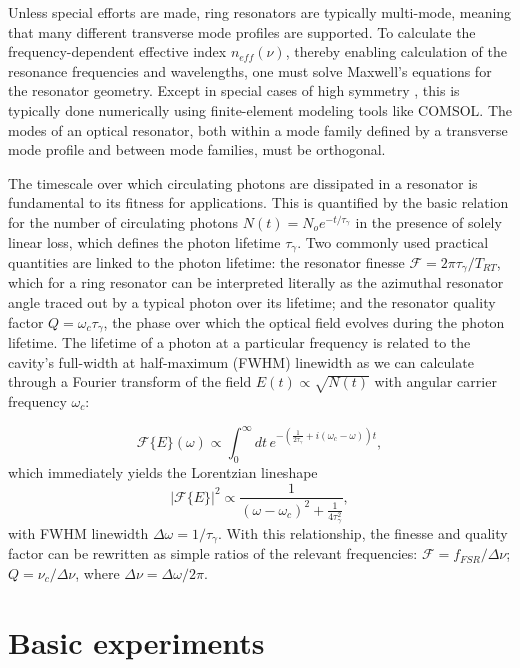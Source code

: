 	 Unless special efforts are made, ring resonators are typically multi-mode, meaning that many different transverse mode profiles are supported. To calculate the frequency-dependent effective index $n_{eff}(\nu)$, thereby enabling calculation of the resonance frequencies and wavelengths, one must solve Maxwell's equations for the resonator geometry. Except in special cases of high symmetry \cite{microsphereresonators}, this is typically done numerically using finite-element modeling tools like COMSOL. The modes of an optical resonator, both within a mode family defined by a transverse mode profile and between mode families, must be orthogonal. 

 The timescale over which circulating photons are dissipated in a resonator is fundamental to its fitness for applications. This is quantified by the basic relation for the number of circulating photons $N(t)=N_oe^{-t/\tau_\gamma}$ in the presence of solely linear loss, which defines the photon lifetime $\tau_\gamma$. Two commonly used practical quantities are linked to the photon lifetime: the resonator finesse $\mathcal{F}=2\pi\tau_\gamma/T_{RT}$, which for a ring resonator can be interpreted literally as the azimuthal resonator angle traced out by a typical photon over its lifetime; and the resonator quality factor $Q=\omega_c \tau_\gamma$, the phase over which the optical field evolves during the photon lifetime. The lifetime of a photon at a particular frequency is related to the cavity's full-width at half-maximum (FWHM) linewidth as we can calculate through a Fourier transform of the field $E(t)\propto\sqrt{N(t)}$ with angular carrier frequency $\omega_c$:

\begin{equation}
\mathcal{F}\{E\}(\omega)\propto\int_0^\infty dt\, e^{-\left(\frac{1}{2\tau_\gamma}+i(\omega_c-\omega)\right)t},
\end{equation}
which immediately yields the Lorentzian lineshape
\begin{equation}
|\mathcal{F}\{E\}|^2\propto\frac{1}{(\omega-\omega_c)^2+\frac{1}{4\tau_\gamma^2}},
\end{equation}
with FWHM linewidth $\Delta\omega=1/\tau_\gamma$. With this relationship, the finesse and quality factor can be rewritten as simple ratios of the relevant frequencies: $\mathcal{F}=f_{FSR}/\Delta\nu$; $Q=\nu_c/\Delta\nu$, where $\Delta\nu=\Delta\omega/2\pi$.

\section{Basic experiments}

